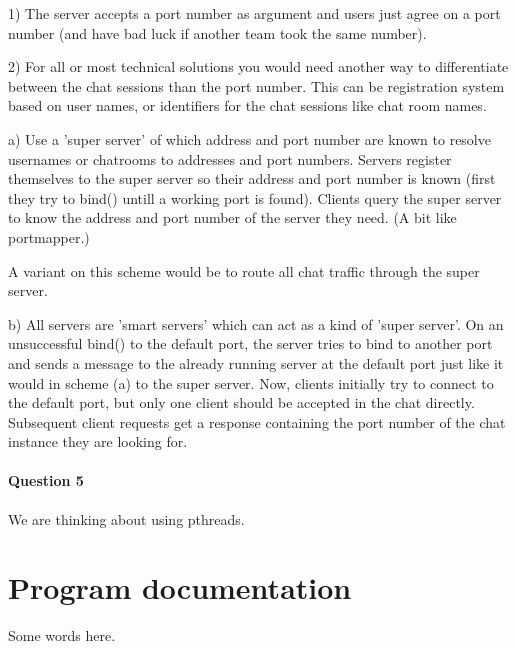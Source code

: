 \documentclass[a4paper,10pt]{article}
\begin{document}
1) The server accepts a port number as argument and users just agree on a port number
   (and have bad luck if another team took the same number).

2) For all or most technical solutions you would need another way to differentiate
   between the chat sessions than the port number. This can be registration system based
   on user names, or identifiers for the chat sessions like chat room names.

   a) Use a 'super server' of which address and port number are known to resolve
      usernames or chatrooms to addresses and port numbers. Servers register themselves
      to the super server so their address and port number is known (first they try to
      bind() untill a working port is found). Clients query the super server to know the
      address and port number of the server they need. (A bit like portmapper.)

      A variant on this scheme would be to route all chat traffic through the super
      server.

   b) All servers are 'smart servers' which can act as a kind of 'super server'. On an
      unsuccessful bind() to the default port, the server tries to bind to another port
      and sends a message to the already running server at the default port just like it
      would in scheme (a) to the super server. Now, clients initially try to connect to
      the default port, but only one client should be accepted in the chat directly.
      Subsequent client requests get a response containing the port number of the chat
      instance they are looking for.

\paragraph{Question 5}
We are thinking about using pthreads.

\section{Program documentation}

Some words here.
\end{document}

